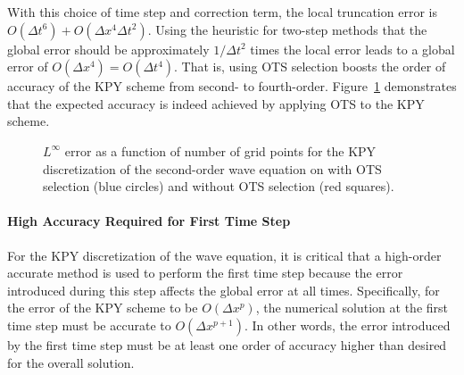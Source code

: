 \documentclass[twocolumn]{article} %
\def\dt{\Delta t}
\def\dx{\Delta x}
\begin{document}
With this choice of time step and correction term, the local truncation
error is $O(\dt^6) + O(\dx^4 \dt^2)$.  Using the heuristic for two-step
methods that the global error should be approximately $1/\dt^2$ times the 
local error leads to a global error of $O(\dx^4) = O(\dt^4)$.  That is, using
OTS selection boosts the order of accuracy of the KPY scheme from second-
to fourth-order.  Figure~\ref{fig:wave_eqn_1d_error} demonstrates that the 
expected accuracy is indeed achieved by applying OTS to the KPY scheme. 

\begin{figure}[thb]
\begin{center}
\caption{$L^\infty$ error as a function of number of grid points for the
KPY discretization of the second-order wave equation on with OTS selection 
(blue circles) and without OTS selection (red squares).
}
\label{fig:wave_eqn_1d_error}
\end{center}
\end{figure}

\paragraph{High Accuracy Required for First Time Step}
For the KPY discretization of the wave equation, it is critical that a 
high-order accurate method is used to perform the first time step because 
the error introduced during this step affects the global error at all times.
Specifically, for the error of the KPY scheme to be $O(\dx^p)$, the numerical
solution at the first time step must be accurate to $O(\dx^{p+1})$.  In other 
words, the error introduced by the first time step must be at least one order
of accuracy higher than desired for the overall solution.
\end{document}
